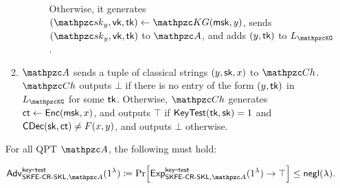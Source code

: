 \begin{definition}
\begin{itemize}
\begin{enumerate}
\begin{description}
Otherwise, it generates $(\qsk_y,\vk,\tk)\la\qKG(\msk,y)$, sends
$(\qsk_y,\vk,\tk)$ to $\qA$, and adds $(y,\mathsf{tk})$ to $\List{\qKG}$.
\end{description}

\item $\qA$ sends a tuple of classical strings $(y, \mathsf{sk}, x)$ to $\qCh$.
$\qCh$ outputs $\bot$ if there is no entry of the form $(y,\mathsf{tk})$ in $\List{\qKG}$ for some $\mathsf{tk}$.
Otherwise, $\qCh$ generates $\mathsf{ct}\leftarrow\mathsf{Enc}(\mathsf{msk},x)$, and outputs $\top$ if
$\mathsf{KeyTest}(\mathsf{tk},\mathsf{sk})=1$ and $\mathsf{CDec}(\mathsf{sk},\mathsf{ct})\ne F(x,y)$, and outputs $\bot$ otherwise.
\end{enumerate}

For all QPT $\qA$, the following must hold:

\begin{align}
\advb{\SKFESKL,\qA}{key}{test}(1^\secp) \seteq
\Pr[\expb{\SKFESKL,\qA}{key}{test}(1^\secp) \ra \top] \le
\negl(\secp).
\end{align} 
\end{itemize}
\end{definition}



